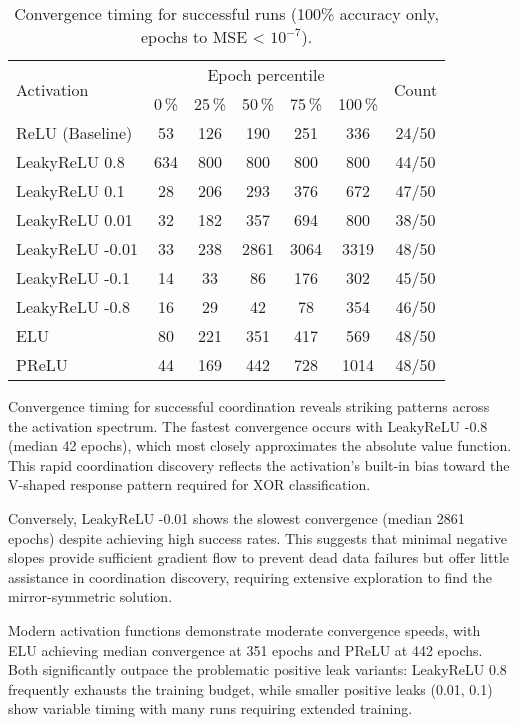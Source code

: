 \begin{table}[ht]
\centering
\caption{Convergence timing for successful runs (100\% accuracy only, epochs to MSE < $10^{-7}$).}
\label{tab:relu1-activation-timing}
\begin{tabular}{lcccccc}
\toprule
\multirow{2}{*}{Activation} &
\multicolumn{5}{c}{Epoch percentile} & \multirow{2}{*}{Count} \\
\cmidrule(lr){2-6}
 & 0\,\% & 25\,\% & 50\,\% & 75\,\% & 100\,\% & \\
\midrule
ReLU (Baseline) & 53 & 126 & 190 & 251 & 336 & 24/50 \\
LeakyReLU 0.8 & 634 & 800 & 800 & 800 & 800 & 44/50 \\
LeakyReLU 0.1 & 28 & 206 & 293 & 376 & 672 & 47/50 \\
LeakyReLU 0.01 & 32 & 182 & 357 & 694 & 800 & 38/50 \\
LeakyReLU -0.01 & 33 & 238 & 2861 & 3064 & 3319 & 48/50 \\
LeakyReLU -0.1 & 14 & 33 & 86 & 176 & 302 & 45/50 \\
LeakyReLU -0.8 & 16 & 29 & 42 & 78 & 354 & 46/50 \\
ELU & 80 & 221 & 351 & 417 & 569 & 48/50 \\
PReLU & 44 & 169 & 442 & 728 & 1014 & 48/50 \\
\bottomrule
\end{tabular}
\end{table}

Convergence timing for successful coordination reveals striking patterns across the activation spectrum. The fastest convergence occurs with LeakyReLU -0.8 (median 42 epochs), which most closely approximates the absolute value function. This rapid coordination discovery reflects the activation's built-in bias toward the V-shaped response pattern required for XOR classification.

Conversely, LeakyReLU -0.01 shows the slowest convergence (median 2861 epochs) despite achieving high success rates. This suggests that minimal negative slopes provide sufficient gradient flow to prevent dead data failures but offer little assistance in coordination discovery, requiring extensive exploration to find the mirror-symmetric solution.

Modern activation functions demonstrate moderate convergence speeds, with ELU achieving median convergence at 351 epochs and PReLU at 442 epochs. Both significantly outpace the problematic positive leak variants: LeakyReLU 0.8 frequently exhausts the training budget, while smaller positive leaks (0.01, 0.1) show variable timing with many runs requiring extended training.

